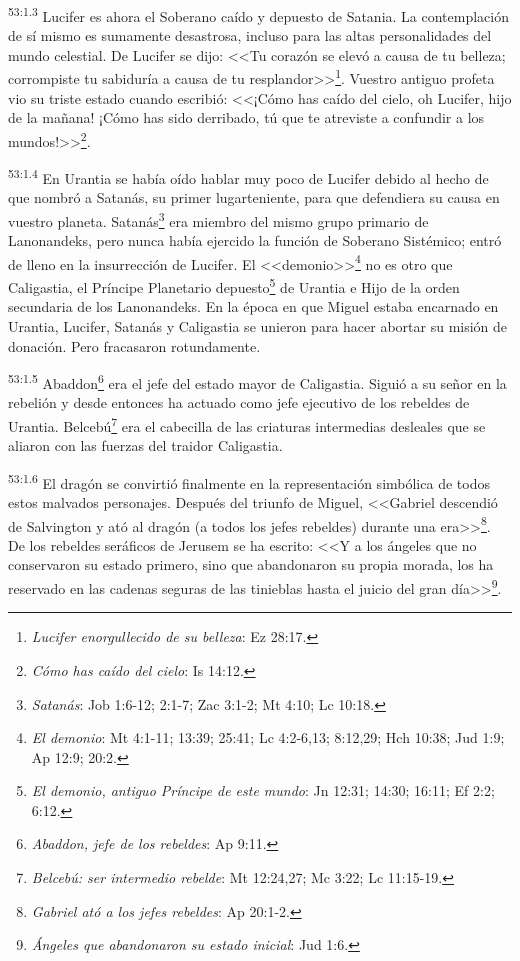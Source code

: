 \par
\textsuperscript{53:1.3} Lucifer es ahora el Soberano caído y depuesto de Satania. La contemplación de sí mismo es sumamente desastrosa, incluso para las altas personalidades del mundo celestial. De Lucifer se dijo: <<Tu corazón se elevó a causa de tu belleza; corrompiste tu sabiduría a causa de tu resplandor>>\footnote{\textit{Lucifer enorgullecido de su belleza}: Ez 28:17.}. Vuestro antiguo profeta vio su triste estado cuando escribió: <<¡Cómo has caído del cielo, oh Lucifer, hijo de la mañana! ¡Cómo has sido derribado, tú que te atreviste a confundir a los mundos!>>\footnote{\textit{Cómo has caído del cielo}: Is 14:12.}.

\par
\textsuperscript{53:1.4} En Urantia se había oído hablar muy poco de Lucifer debido al hecho de que nombró a Satanás, su primer lugarteniente, para que defendiera su causa en vuestro planeta. Satanás\footnote{\textit{Satanás}: Job 1:6-12; 2:1-7; Zac 3:1-2; Mt 4:10; Lc 10:18.} era miembro del mismo grupo primario de Lanonandeks, pero nunca había ejercido la función de Soberano Sistémico; entró de lleno en la insurrección de Lucifer. El <<demonio>>\footnote{\textit{El demonio}: Mt 4:1-11; 13:39; 25:41; Lc 4:2-6,13; 8:12,29; Hch 10:38; Jud 1:9; Ap 12:9; 20:2.} no es otro que Caligastia, el Príncipe Planetario depuesto\footnote{\textit{El demonio, antiguo Príncipe de este mundo}: Jn 12:31; 14:30; 16:11; Ef 2:2; 6:12.} de Urantia e Hijo de la orden secundaria de los Lanonandeks. En la época en que Miguel estaba encarnado en Urantia, Lucifer, Satanás y Caligastia se unieron para hacer abortar su misión de donación. Pero fracasaron rotundamente.

\par
\textsuperscript{53:1.5} Abaddon\footnote{\textit{Abaddon, jefe de los rebeldes}: Ap 9:11.} era el jefe del estado mayor de Caligastia. Siguió a su señor en la rebelión y desde entonces ha actuado como jefe ejecutivo de los rebeldes de Urantia. Belcebú\footnote{\textit{Belcebú: ser intermedio rebelde}: Mt 12:24,27; Mc 3:22; Lc 11:15-19.} era el cabecilla de las criaturas intermedias desleales que se aliaron con las fuerzas del traidor Caligastia.

\par
\textsuperscript{53:1.6} El dragón se convirtió finalmente en la representación simbólica de todos estos malvados personajes. Después del triunfo de Miguel, <<Gabriel descendió de Salvington y ató al dragón (a todos los jefes rebeldes) durante una era>>\footnote{\textit{Gabriel ató a los jefes rebeldes}: Ap 20:1-2.}. De los rebeldes seráficos de Jerusem se ha escrito: <<Y a los ángeles que no conservaron su estado primero, sino que abandonaron su propia morada, los ha reservado en las cadenas seguras de las tinieblas hasta el juicio del gran día>>\footnote{\textit{Ángeles que abandonaron su estado inicial}: Jud 1:6.}.

